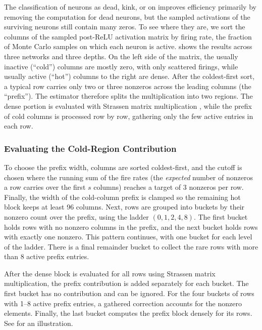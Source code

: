 The classification of neurons as dead, kink, or on improves efficiency primarily by removing the computation for dead neurons, but the sampled activations of the surviving neurons still contain many zeros. To see where they are, we sort the columns of the sampled post-ReLU activation matrix by firing rate, the fraction of Monte Carlo samples on which each neuron is active.  shows the results across three networks and three depths. On the left side of the matrix, the usually inactive (``cold'') columns are mostly zero, with only scattered firings, while usually active (``hot'') columns to the right are dense. After the coldest-first sort, a typical row carries only two or three nonzeros across the leading columns (the ``prefix''). The estimator therefore splits the multiplication into two regions. The dense portion is evaluated with Strassen matrix multiplication \citep{strassen1969gaussian}, while the prefix of cold columns is processed row by row, gathering only the few active entries in each row.

\subsubsection{Evaluating the Cold-Region Contribution}

To choose the prefix width, columns are sorted coldest-first, and the cutoff is chosen where the running sum of the fire rates (the \emph{expected} number of nonzeros a row carries over the first $s$ columns) reaches a target of $3$ nonzeros per row. Finally, the width of the cold-column prefix is clamped so the remaining hot block keeps at least 96 columns. Next, rows are grouped into buckets by their nonzero count over the prefix, using the ladder $(0, 1, 2, 4, 8)$. The first bucket holds rows with no nonzero columns in the prefix, and the next bucket holds rows with exactly one nonzero. This pattern continues, with one bucket for each level of the ladder. There is a final remainder bucket to collect the rare rows with more than 8 active prefix entries. 

After the dense block is evaluated for all rows using Strassen matrix multiplication, the prefix contribution is added separately for each bucket. The first bucket has no contribution and can be ignored. For the four buckets of rows with 1--8 active prefix entries, a gathered correction accounts for the nonzero elements. Finally, the last bucket computes the prefix block densely for its rows. See  for an illustration.



